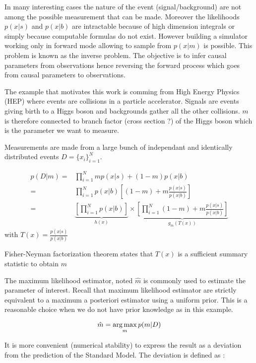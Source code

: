 In many interesting cases the nature of the event (signal/background) are not among the possible measurement that can be made.
Moreover the likelihoods $p(x|s)$ and $p(x|b)$ are intractable because of high dimension integrals or simply because computable formulas do not exist.
However building a simulator working only in forward mode allowing to sample from $p(x|m)$ is possible.
This problem is known as the inverse problem. 
The objective is to infer causal parameters from observations hence reversing the forward process which goes from causal parameters to observations.


The example that motivates this work is comming from High Energy Physics (HEP) where events are collisions in a particle accelerator.
Signals are events giving birth to a Higgs boson and backgrounds gather all the other collisions.
$m$ is therefore connected to branch factor (cross section ?) of the Higgs boson which is the parameter we want to measure.


Measurements are made from a large bunch of independant and identically distributed events $D=\{x_i\}_{i=1}^N$.

\begin{align*}
	p(D|m) =& \prod_{i=1}^N m p(x|s) + (1-m) p(x|b) \\
	       =& \prod_{i=1}^N p(x|b) \left [(1-m) + m \frac{p(x|s)}{p(x|b)} \right ]\\
	       =& \underbrace{\left[ \prod_{i=1}^N p(x|b) \right ]}_{h(x)} \times 
	       \underbrace{\left [\prod_{i=1}^N (1-m) + m \frac{p(x|s)}{p(x|b)} \right ]}_{g_m(T(x))}
\end{align*}
with $T(x) = \frac{p(x|s)}{p(x|b)} $

Fisher-Neyman factorization theorem states that $T(x)$ is a sufficient summary statistic to obtain $m$

The maximum likelihood estimator, noted $\hat m$ is commonly used to estimate the parameter of interest.
Recall that maximum likelihood estimator are strictly equivalent to a maximum a posteriori estimator using a uniform prior.
This is a reasonable choice when we do not have prior knowledge as in this example.

\begin{equation}
	\hat m = \operatorname*{arg\,max}_m p(m | D)
\end{equation}

It is more convenient (numerical stability) to express the result as a deviation from the prediction of the Standard Model.
The deviation is defined as :

